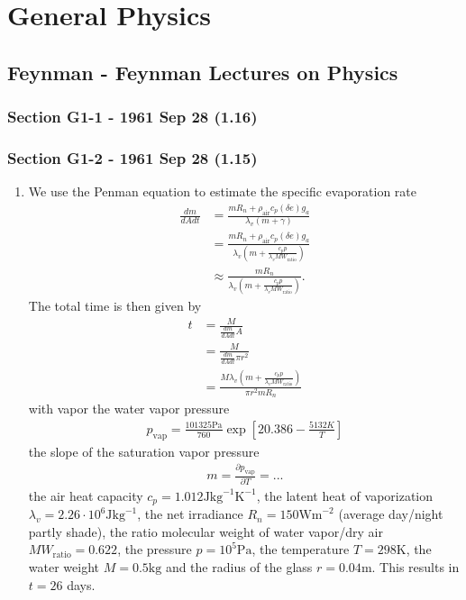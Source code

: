 \documentclass[10pt,a4paper]{book}
\theoremstyle{definition}
\begin{document}
\chapter{General Physics}

\section{{\sc Feynman} - Feynman Lectures on Physics}
\subsection{Section G1-1 - 1961 Sep 28 (1.16)}
\subsection{Section G1-2 - 1961 Sep 28 (1.15)}
\begin{enumerate}[label=(\alph*)]
\item  We use the Penman equation to estimate the specific evaporation rate
\begin{align}
    \frac{dm}{dA dt}
    &=\frac{m R_n + \rho_\text{air}c_p (\delta e)g_a}{\lambda_v(m+\gamma)}\\
    &=\frac{m R_n + \rho_\text{air}c_p (\delta e)g_a}{\lambda_v(m+\frac{c_p p}{\lambda_v MW_\text{ratio}})}\\
    &\approx\frac{m R_n}{\lambda_v(m+\frac{c_p p}{\lambda_v MW_\text{ratio}})}.
\end{align}
The total time is then given by
\begin{align}
    t&=\frac{M}{\frac{dm}{dA dt}A}\\
    &=\frac{M}{\frac{dm}{dA dt}\pi r^2}\\
    &=\frac{M\lambda_v(m+\frac{c_p p}{\lambda_v MW_\text{ratio}})}{\pi r^2 m R_n }
\end{align}
with vapor the water vapor pressure
\begin{align}
    p_\text{vap}=\frac{101325\text{Pa}}{760} \exp\left[20.386 - \frac{5132K}{T}\right]
\end{align}
the slope of the saturation vapor pressure
\begin{align}
    m=\frac{\partial p_\text{vap}}{\partial T}=...
\end{align}
the air heat capacity $c_p=1.012\text{J}\text{kg}^{-1}\text{K}^{-1}$, the latent heat of vaporization $\lambda_v=2.26\cdot10^6 \text{J}\text{kg}^{-1}$, the net irradiance $R_n=150\text{Wm}^{-2}$ (average day/night partly shade), the ratio molecular weight of water vapor/dry air $MW_\text{ratio}=0.622$, the pressure $p=10^5\text{Pa}$, the temperature $T= 298\text{K}$, the water weight $M=0.5\text{kg}$ and the radius of the glass $r=0.04\text{m}$. This results in $t=26$ days.


\end{enumerate}
\end{document}
